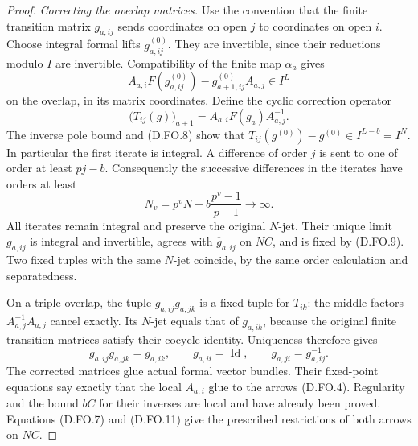 \begin{proof}
\emph{Correcting the overlap matrices.}
Use the convention that the finite transition matrix
$\overline g_{a,ij}$ sends coordinates on open $j$ to
coordinates on open $i$. Choose integral formal lifts
$g^{(0)}_{a,ij}$. They are invertible, since their
reductions modulo $I$ are invertible. Compatibility of
the finite map $\alpha_a$ gives
\[
 A_{a,i}F(g^{(0)}_{a,ij})
       -g^{(0)}_{a+1,ij}A_{a,j}\in I^L
                                                        \tag{D.FO.8}
\]
on the overlap, in its matrix coordinates. Define the
cyclic correction operator
\[
 \bigl(T_{ij}(g)\bigr)_{a+1}
                 =A_{a,i}F(g_a)A_{a,j}^{-1}.            \tag{D.FO.9}
\]
The inverse pole bound and (D.FO.8) show that
$T_{ij}(g^{(0)})-g^{(0)}\in I^{L-b}=I^N$.
In particular the first iterate is integral. A difference
of order $j$ is sent to one of order at least $pj-b$.
Consequently the successive differences in the iterates
have orders at least
\[
        N_v=p^vN-b\frac{p^v-1}{p-1}\longrightarrow\infty.
                                                        \tag{D.FO.10}
\]
All iterates remain integral and preserve the original
$N$-jet. Their unique limit $g_{a,ij}$ is integral and
invertible, agrees with $\overline g_{a,ij}$ on $NC$,
and is fixed by (D.FO.9). Two fixed tuples with the same
$N$-jet coincide, by the same order calculation and
separatedness.

On a triple overlap, the tuple
$g_{a,ij}g_{a,jk}$ is a fixed tuple for $T_{ik}$: the
middle factors $A_{a,j}^{-1}A_{a,j}$ cancel exactly.
Its $N$-jet equals that of $g_{a,ik}$, because the
original finite transition matrices satisfy their
cocycle identity. Uniqueness therefore gives
\[
       g_{a,ij}g_{a,jk}=g_{a,ik},\qquad
       g_{a,ii}=\operatorname{Id},\qquad
       g_{a,ji}=g_{a,ij}^{-1}.                          \tag{D.FO.11}
\]
The corrected matrices glue actual formal vector bundles.
Their fixed-point equations say exactly that the local
$A_{a,i}$ glue to the arrows (D.FO.4). Regularity and
the bound $bC$ for their inverses are local and have
already been proved. Equations (D.FO.7) and (D.FO.11)
give the prescribed restrictions of both arrows on $NC$.


\end{proof}
